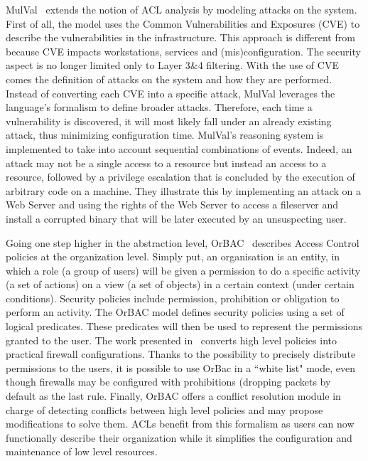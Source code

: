 MulVal~\cite{mulval-Ou2013} extends the notion of ACL analysis by modeling attacks on the system. First of all, the model uses the Common Vulnerabilities and Exposures (CVE) to describe the vulnerabilities in the infrastructure. This approach is different from~\cite{Matousek2008} because CVE impacts workstations, services and (mis)configuration. The security aspect is no longer limited only to Layer 3\&4 filtering.
With the use of CVE comes the definition of attacks on the system and how they are performed.
Instead of converting each CVE into a specific attack, MulVal leverages the language's formalism to define broader attacks.
Therefore, each time a vulnerability is discovered, it will most likely fall under an already existing attack, thus minimizing configuration time.
MulVal's reasoning system is implemented to take into account sequential combinations of events.
Indeed, an attack may not be a single access to a resource but instead an access to a resource, followed by a privilege escalation that is concluded by the execution of arbitrary code on a machine.
They illustrate this by implementing an attack on a Web Server and using the rights of the Web Server to access a fileserver and install a corrupted binary that will be later executed by an unsuspecting user.

Going one step higher in the abstraction level, OrBAC~\cite{orbac} describes Access Control policies at the organization level. Simply put, an organisation is an entity, in which a role (\ie a group of users) will be given a permission to do a specific activity (\ie a set of actions) on a view (\ie a set of objects) in a certain context (\ie under certain conditions).
Security policies include permission, prohibition or obligation to perform an activity.
The OrBAC model defines security policies using a set of logical predicates. These predicates will then be used to represent the permissions granted to the user.
The work presented in~\cite{Cuppens} converts high level policies into practical firewall configurations. Thanks to the possibility to precisely distribute permissions to the users, it is possible to use OrBac in a ``white list" mode, even though firewalls may be configured with prohibitions (\ie dropping packets by default as the last rule.
Finally, OrBAC offers a conflict resolution module in charge of detecting conflicts between high level policies and may propose modifications to solve them.
ACLs benefit from this formalism as users can now functionally describe their organization while it simplifies the configuration and maintenance of low level resources.

